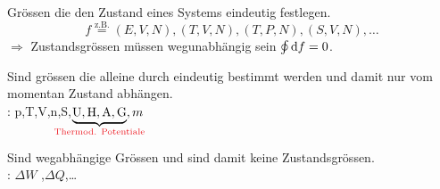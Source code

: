 \begin{defnbox}\nospacing
  \begin{defn}[Zustandsvariablen]
    Grössen die den Zustand eines Systems eindeutig festlegen.
    \[f\stackrel{\text{z.B.}}{=}(E,V,N),(T,V,N),(T,P,N),(S,V,N),\ldots\]
    $\Rightarrow$ Zustandsgrössen müssen wegunabhängig sein $\oint\diff f=0$.
  \end{defn}
\end{defnbox}
\begin{defnbox}
  \begin{defn}
    Sind grössen die alleine durch  eindeutig bestimmt werden und damit nur vom momentan Zustand abhängen.\\
    : p,T,V,n,S,$\underbrace{\text{U},\text{H},\text{A},\text{G}}_{\mathclap{\text{\rd{Thermod. Potentiale}}}},m$
  \end{defn}
\end{defnbox}
\begin{defnbox}
  \begin{defn}[Prozessgrössen]
    Sind wegabhängige Grössen und sind damit keine Zustandsgrössen.\\
    : $\Delta W$ ,$\Delta Q$,\ldots
  \end{defn}
\end{defnbox}
